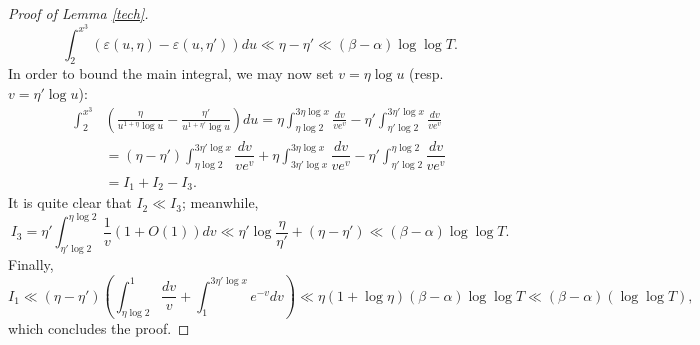 \documentclass[10pt,a4paper]{amsart}
\newcommand{\eps}{\varepsilon}
\begin{document}
\begin{proof}[Proof of Lemma \ref{tech}]
\begin{equation}
    \int_2^{x^3} (\eps(u, \eta) - \eps(u, \eta'))du \ll \eta - \eta' \ll (\beta - \alpha) \log \log T.
\end{equation}
In order to bound the main integral, we may now set $v = \eta \log u$ (resp. $v = \eta' \log u$):
\begin{equation}
    \begin{split}
        \int_2^{x^3} & \left(\frac{\eta}{u^{1 + \eta} \log u} - \frac{\eta'}{u^{1 + \eta'}\log u} \right) du  = \eta \int_{\eta \log 2}^{3 \eta \log x} \frac{dv}{v e^v} - \eta' \int_{\eta' \log 2}^{3\eta' \log x} \frac{dv}{v e^v} \\
        & = (\eta - \eta') \int_{\eta \log 2}^{3 \eta' \log x} \dfrac{dv}{v e^v} + \eta \int_{3 \eta' \log x}^{3 \eta \log x}\dfrac{dv}{v e^v} - \eta' \int_{\eta' \log 2}^{\eta \log 2} \dfrac{dv}{v e^v} \\
        & = I_1 + I_2 - I_3.
    \end{split}
\end{equation}
It is quite clear that $I_2 \ll I_3$; meanwhile,
\begin{equation}
    I_3 = \eta' \int_{\eta' \log 2}^{\eta \log 2} \frac{1}{v}(1 + O(1))dv \ll \eta' \log \frac{\eta}{\eta'} + (\eta - \eta') \ll (\beta - \alpha) \log \log T.
\end{equation}
Finally,
\begin{equation}
        I_1  \ll (\eta - \eta') \left( \int_{\eta \log 2}^1 \dfrac{dv}{v} + \int_{1}^{3 \eta' \log x} e^{-v} dv \right) 
\ll \eta (1 + \log \eta)(\beta - \alpha) \log \log T \ll (\beta - \alpha)(\log \log T),
\end{equation}
which concludes the proof.
\end{proof}
\end{document}
